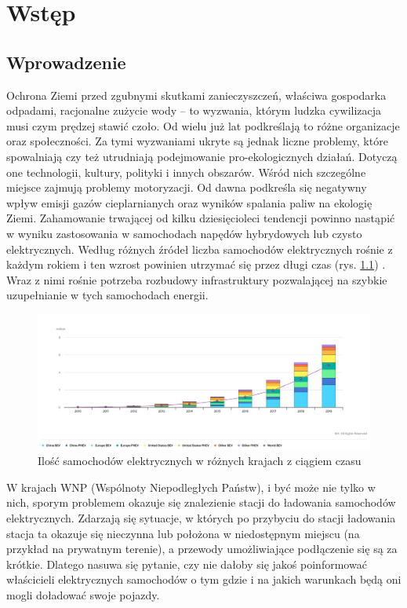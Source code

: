 \chapter{Wstęp}

\section{Wprowadzenie}
Ochrona Ziemi przed zgubnymi skutkami zanieczyszczeń, właściwa gospodarka odpadami, racjonalne zużycie wody -- to wyzwania, którym ludzka cywilizacja musi czym prędzej stawić czoło. Od wielu już lat podkreślają to różne organizacje oraz społeczności. Za tymi wyzwaniami ukryte są jednak liczne problemy, które spowalniają czy też utrudniają podejmowanie pro-ekologicznych działań. Dotyczą one technologii, kultury, polityki i innych obszarów. Wśród nich szczególne miejsce zajmują problemy motoryzacji. Od dawna podkreśla się negatywny wpływ emisji gazów cieplarnianych oraz wyników spalania paliw na ekologię Ziemi. Zahamowanie trwającej od kilku dziesięcioleci tendencji powinno nastąpić w wyniku zastosowania w samochodach napędów hybrydowych lub czysto elektrycznych. Według różnych źródeł liczba samochodów elektrycznych rośnie z każdym rokiem i ten wzrost powinien utrzymać się przez długi czas (rys. \ref{fig:car_chart}) \cite{iea1,mam1}. Wraz z nimi rośnie potrzeba rozbudowy infrastruktury pozwalającej na szybkie uzupełnianie w tych samochodach energii. 
\begin{figure}[ht]
    \centering
        \includegraphics[width=1\linewidth]{rys01/chart.png}
        \caption{Ilość samochodów elektrycznych w różnych krajach z ciągiem czasu \cite{car_chart}}
    \label{fig:car_chart}
\end{figure}

W krajach WNP (Wspólnoty Niepodległych Państw), i być może nie tylko w nich, sporym problemem okazuje się znalezienie stacji do ładowania samochodów elektrycznych. Zdarzają się sytuacje, w których po przybyciu do stacji ładowania stacja ta okazuje się nieczynna lub położona w niedostępnym miejscu (na przykład na prywatnym terenie), a przewody umożliwiające podłączenie się są za krótkie. Dlatego nasuwa się pytanie, czy nie dałoby się jakoś poinformować właścicieli elektrycznych samochodów o tym gdzie i na jakich warunkach będą oni mogli doładować swoje pojazdy. 


